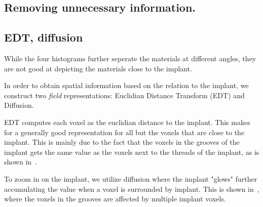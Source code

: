 \subsection{Removing unnecessary information.}

\subsection{EDT, diffusion}
While the four histograms further seperate the materials at different angles, they are not good at depicting the materials close to the implant.

In order to obtain spatial information based on the relation to the implant, we construct two \emph{field} representations: Euclidian Distance Transform (EDT) and Diffusion.

EDT computes each voxel as the euclidian distance to the implant. This makes for a generally good representation for all but the voxels that are close to the implant. This is mainly due to the fact that the voxels in the grooves of the implant gets the same value as the voxels next to the threads of the implant, as is shown in~.

To zoom in on the implant, we utilize diffusion where the implant "glows" further accumulating the value when a voxel is surrounded by implant. This is shown in~, where the voxels in the grooves are affected by multiple implant voxels.

